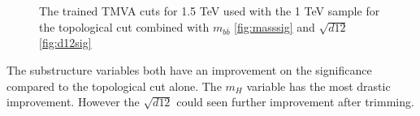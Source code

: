 \begin{figure}[H]
\hspace{-2.5cm}
\caption{The trained TMVA cuts for 1.5 TeV used with the 1 TeV sample for the topological cut combined with $m_{b\bar{b}}$ \ref{fig:masssig} and $\sqrt{d12}$ \ref{fig:d12sig}}
\label{fig:sig}
\end{figure}

The substructure variables both have an improvement on the significance compared to the topological cut alone. The $m_{H}$ variable has the most drastic improvement. However the $\sqrt{d12}$ could seen further improvement after trimming. 
